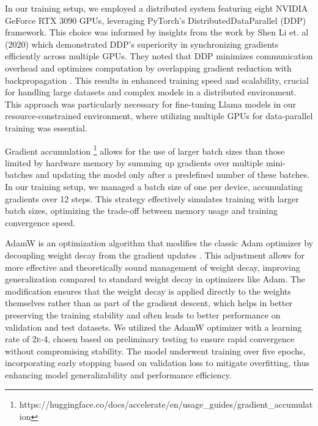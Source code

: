 \documentclass[logo,msc]{infthesis}           %
\begin{document}

In our training setup, we employed a distributed system featuring eight NVIDIA GeForce RTX 3090 GPUs, leveraging PyTorch's DistributedDataParallel (DDP) framework. This choice was informed by insights from the work by Shen Li et. al (2020) which demonstrated DDP's superiority in synchronizing gradients efficiently across multiple GPUs. They noted that DDP minimizes communication overhead and optimizes computation by overlapping gradient reduction with backpropagation \cite{li2020pytorchdistributedexperiencesaccelerating}. This results in enhanced training speed and scalability, crucial for handling large datasets and complex models in a distributed environment. This approach was particularly necessary for fine-tuning Llama models in our resource-constrained environment, where utilizing multiple GPUs for data-parallel training was essential. 

Gradient accumulation \footnote{https://huggingface.co/docs/accelerate/en/usage\_guides/gradient\_accumulation} allows for the use of larger batch sizes than those limited by hardware memory by summing up gradients over multiple mini-batches and updating the model only after a predefined number of these batches. In our training setup, we managed a batch size of one per device, accumulating gradients over 12 steps. This strategy effectively simulates training with larger batch sizes, optimizing the trade-off between memory usage and training convergence speed.

AdamW is an optimization algorithm that modifies the classic Adam optimizer by decoupling weight decay from the gradient updates \cite{loshchilov2019decoupledweightdecayregularization}. This adjustment allows for more effective and theoretically sound management of weight decay, improving generalization compared to standard weight decay in optimizers like Adam. The modification ensures that the weight decay is applied directly to the weights themselves rather than as part of the gradient descent, which helps in better preserving the training stability and often leads to better performance on validation and test datasets. We utilized the AdamW optimizer with a learning rate of \textsc{2e-4}, chosen based on preliminary testing to ensure rapid convergence without compromising stability. The model underwent training over five epochs, incorporating early stopping based on validation loss to mitigate overfitting, thus enhancing model generalizability and performance efficiency.
\end{document}
